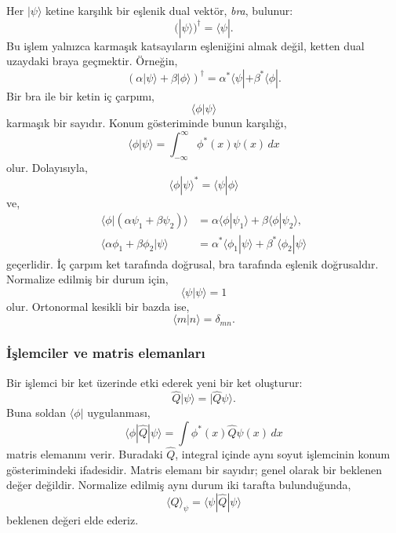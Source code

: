 \documentclass[00_kitap.tex]{subfiles}
\begin{document}
Her $|\psi\rangle$ ketine karşılık bir eşlenik dual vektör,
\emph{bra}, bulunur:
\begin{equation}
 (|\psi\rangle)^\dagger=\langle\psi|.
\end{equation}
Bu işlem yalnızca karmaşık katsayıların eşleniğini almak değil,
ketten dual uzaydaki braya geçmektir. Örneğin,
\begin{equation}
 (\alpha|\psi\rangle+\beta|\phi\rangle)^\dagger
 =\alpha^*\langle\psi|+\beta^*\langle\phi|.
\end{equation}
Bir bra ile bir ketin iç çarpımı,
\begin{equation}
 \langle\phi|\psi\rangle
\end{equation}
karmaşık bir sayıdır. Konum gösteriminde bunun karşılığı,
\begin{equation}
 \langle\phi|\psi\rangle
 =\int_{-\infty}^{\infty}\phi^*(x)\psi(x)\,dx
 \label{eq:06_ic_carpim}
\end{equation}
olur. Dolayısıyla,
\begin{equation}
 \boxed{\langle\phi|\psi\rangle^*
       =\langle\psi|\phi\rangle}
 \label{eq:06_ic_carpim_eslenik}
\end{equation}
ve,
\begin{align}
 \langle\phi|(\alpha\psi_1+\beta\psi_2)\rangle
 &=\alpha\langle\phi|\psi_1\rangle
   +\beta\langle\phi|\psi_2\rangle,\\
 \langle\alpha\phi_1+\beta\phi_2|\psi\rangle
 &=\alpha^*\langle\phi_1|\psi\rangle
   +\beta^*\langle\phi_2|\psi\rangle
\end{align}
geçerlidir. İç çarpım ket tarafında doğrusal, bra tarafında
eşlenik doğrusaldır. Normalize edilmiş bir durum için,
\begin{equation}
 \langle\psi|\psi\rangle=1
\end{equation}
olur. Ortonormal kesikli bir bazda ise,
\begin{equation}
 \langle m|n\rangle=\delta_{mn}.
 \label{eq:06_baz_ortonormal}
\end{equation}

\subsubsection{İşlemciler ve matris elemanları}

Bir işlemci bir ket üzerinde etki ederek yeni bir ket oluşturur:
\begin{equation}
 \hat Q|\psi\rangle=|\hat Q\psi\rangle.
\end{equation}
Buna soldan $\langle\phi|$ uygulanması,
\begin{equation}
 \langle\phi|\hat Q|\psi\rangle
 =\int\phi^*(x)\hat Q\psi(x)\,dx
 \label{eq:06_matris_elemani}
\end{equation}
matris elemanını verir. Buradaki $\hat Q$, integral içinde aynı
soyut işlemcinin konum gösterimindeki ifadesidir. Matris elemanı
bir sayıdır; genel olarak bir beklenen değer değildir. Normalize
edilmiş aynı durum iki tarafta bulunduğunda,
\begin{equation}
 \langle Q\rangle_\psi=\langle\psi|\hat Q|\psi\rangle
\end{equation}
beklenen değeri elde ederiz.
\end{document}
